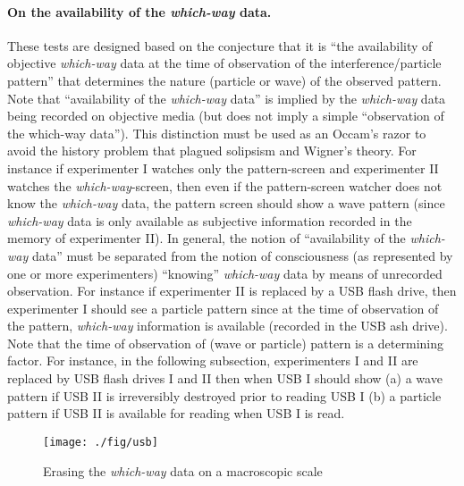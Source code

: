 \documentclass[11pt]{article}
\theoremstyle{definition}
\begin{document}
\paragraph{On the  availability of the \emph{which-way} data.}
These tests are designed based on the  conjecture  that it is ``the availability of objective \emph{which-way} data at the time of observation of the interference/particle pattern''  that determines the nature (particle or wave) of the observed pattern. Note that ``availability of the \emph{which-way} data'' is implied by the \emph{which-way} data being recorded on objective media (but does not imply a simple ``observation of the which-way data''). This distinction must be used as an Occam's razor to avoid the history problem that plagued solipsism and Wigner's theory.
For instance if experimenter I watches only the pattern-screen and experimenter II watches the \emph{which-way}-screen, then even if the pattern-screen watcher does not know the \emph{which-way} data,  the pattern screen should show a wave pattern (since \emph{which-way}
data is only available as subjective information recorded in the memory of experimenter II).
In general, the notion of ``availability of the \emph{which-way} data'' must be separated from the notion of consciousness (as represented by one or more experimenters) ``knowing'' \emph{which-way} data by means of unrecorded observation. For instance if experimenter II is replaced by a USB flash drive, then experimenter I should see a particle pattern since at the time of observation of the pattern,  \emph{which-way} information is available (recorded in the USB ash drive). Note that the time of observation of (wave or particle) pattern is a determining factor. For instance, in the following subsection, experimenters I and II are replaced by USB flash drives I and II then when USB I should show (a) a wave pattern if USB II is irreversibly destroyed prior to reading USB I (b) a particle pattern if USB II is available for reading when USB I is read.



 \begin{figure}[h!]
	\begin{center}
			\texttt{[image: ./fig/usb]}
		\caption{Erasing the \emph{which-way} data on a macroscopic scale}\label{figsub}
	\end{center}
\end{figure}
\end{document}
